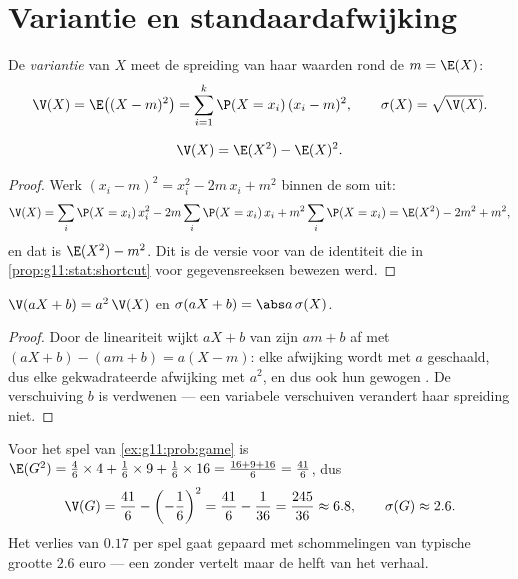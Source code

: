 \section{Variantie en standaardafwijking}

\begin{definition}[Variantie]\label{def:g11:prob:variance}
De \emph{variantie} van $X$ meet de spreiding van haar
waarden rond de  $m = \E(X)$:
\[
\V(X) = \E\bigl((X - m)^2\bigr)
= \sum_{i=1}^{k} \P(X = x_i)\,(x_i - m)^2,
\qquad
\sigma(X) = \sqrt{\V(X)} .
\]
\end{definition}

\begin{proposition}[Rekenformule]\label{prop:g11:prob:konig}
\[
\V(X) = \E(X^2) - \E(X)^2 .
\]
\end{proposition}

\begin{proof}
Werk $(x_i - m)^2 = x_i^2 - 2m\,x_i + m^2$ binnen de som uit:
\[
\V(X) = \sum_i \P(X = x_i)\,x_i^2
- 2m \sum_i \P(X = x_i)\,x_i + m^2\sum_i \P(X = x_i)
= \E(X^2) - 2m^2 + m^2 ,
\]
en dat is $\E(X^2) - m^2$. Dit is de versie voor  van de
identiteit die in \cref{prop:g11:stat:shortcut} voor gegevensreeksen bewezen
werd.
\end{proof}

\begin{proposition}\label{prop:g11:prob:affine}
$\V(aX + b) = a^2\,\V(X)$ en $\sigma(aX + b) = \abs a\,\sigma(X)$.
\end{proposition}

\begin{proof}
Door de lineariteit wijkt $aX + b$ van zijn  $a m + b$ af
met $(aX + b) - (am + b) = a(X - m)$: elke afwijking wordt met $a$
geschaald, dus elke gekwadrateerde afwijking met $a^2$, en dus ook hun
gewogen . De verschuiving $b$ is verdwenen --- een variabele
verschuiven verandert haar spreiding niet.
\end{proof}

\begin{example}\label{ex:g11:prob:variance}
Voor het spel van \cref{ex:g11:prob:game} is
$\E(G^2) = \frac46 \times 4 + \frac16 \times 9 + \frac16 \times 16
= \frac{16 + 9 + 16}{6} = \frac{41}{6}$, dus
\[
\V(G) = \frac{41}{6} - \left(-\frac16\right)^2
= \frac{41}{6} - \frac{1}{36} = \frac{245}{36} \approx 6.8,
\qquad
\sigma(G) \approx 2.6 .
\]
Het  verlies van $0.17$ per spel gaat gepaard met schommelingen
van typische grootte $2.6$ euro --- een  zonder
 vertelt maar de helft van het verhaal.
\end{example}

